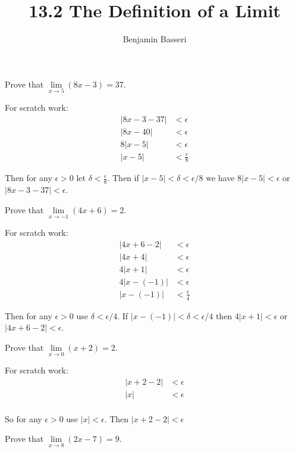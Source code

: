 \documentclass{article}
\title{13.2 The Definition of a Limit}
\author{Benjamin Basseri}
\begin{document}
\maketitle
\begin{problem}
Prove that $\lim\limits_{x\to 5} (8x - 3) = 37$.
\end{problem}

For scratch work:
\begin{align*}
  |8x - 3 - 37| & < \epsilon           \\
  |8x -40 |     & < \epsilon           \\
  8|x - 5|      & < \epsilon           \\
  |x - 5|       & < \frac{\epsilon}{8}
\end{align*}

Then for any $\epsilon > 0$ let $\delta < \frac{\epsilon}{8}$. Then if $|x - 5 | < \delta < \epsilon/8$ we have $8|x - 5| < \epsilon$ or $|8x - 3 - 37| < \epsilon$.

\begin{problem}
Prove that $\lim\limits_{x \to -1} (4x + 6) = 2$.
\end{problem}


For scratch work:
\begin{align*}
  |4x + 6 - 2| & < \epsilon           \\
  |4x + 4|     & < \epsilon           \\
  4|x + 1|     & < \epsilon           \\
  4|x - (-1)|  & < \epsilon           \\
  |x - (-1)|   & < \frac{\epsilon}{4}
\end{align*}

Then for any $\epsilon > 0$ use $\delta < \epsilon / 4$. If $|x - (-1)| < \delta < \epsilon / 4$ then $4|x + 1| < \epsilon$ or $|4x + 6 - 2| < \epsilon$.

\begin{problem}
Prove that $\lim\limits_{x\to 0}(x + 2) = 2$.
\end{problem}

For scratch work:
\begin{align*}
  |x + 2 - 2| & < \epsilon \\
  |x|         & < \epsilon \\
\end{align*}

So for any $\epsilon > 0$ use $|x| < \epsilon$. Then $|x + 2 - 2| < \epsilon$

\begin{problem}
Prove that $\lim\limits_{x \to 8} (2x - 7) = 9$.
\end{problem}
\end{document}
